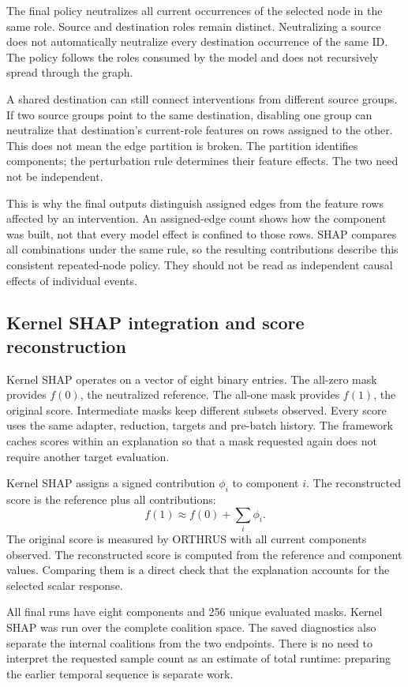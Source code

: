 \documentclass[11pt,a4paper]{article}
\begin{document}
The final policy neutralizes all current occurrences of the selected node in
the same role. Source and destination roles remain distinct. Neutralizing a
source does not automatically neutralize every destination occurrence of the
same ID. The policy follows the roles consumed by the model and does not
recursively spread through the graph.

A shared destination can still connect interventions from different source
groups. If two source groups point to the same destination, disabling one group
can neutralize that destination's current-role features on rows assigned to
the other. This does not mean the edge partition is broken. The partition
identifies components; the perturbation rule determines their feature effects.
The two need not be independent.

This is why the final outputs distinguish assigned edges from the feature rows
affected by an intervention. An assigned-edge count shows how the component
was built, not that every model effect is confined to those rows. SHAP compares
all combinations under the same rule, so the resulting contributions describe
this consistent repeated-node policy. They should not be read as independent
causal effects of individual events.

\subsection{Kernel SHAP integration and score reconstruction}
Kernel SHAP operates on a vector of eight binary entries. The all-zero mask
provides $f(0)$, the neutralized reference. The all-one mask provides $f(1)$,
the original score. Intermediate masks keep different subsets observed.
Every score uses the same adapter, reduction, targets and pre-batch history.
The framework caches scores within an explanation so that a mask requested
again does not require another target evaluation.

Kernel SHAP assigns a signed contribution $\phi_i$ to component $i$. The
reconstructed score is the reference plus all contributions:
\[
  f(1)\approx f(0)+\sum_i\phi_i.
\]
The original score is measured by ORTHRUS with all current components observed.
The reconstructed score is computed from the reference and component values.
Comparing them is a direct check that the explanation accounts for the selected
scalar response.

All final runs have eight components and 256 unique evaluated masks. Kernel
SHAP was run over the complete coalition space. The saved diagnostics also
separate the internal coalitions from the two endpoints. There is no need to
interpret the requested sample count as an estimate of total runtime: preparing
the earlier temporal sequence is separate work.
\end{document}
